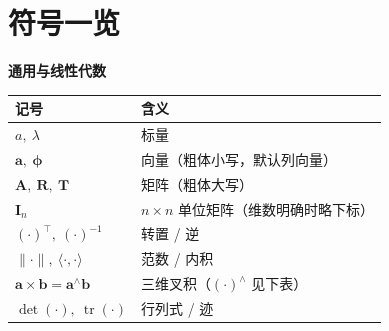 \section*{符号一览}

\begin{center}\small
\textbf{通用与线性代数}\par\vspace{3pt}
\begin{tabular}{ll}
\toprule
记号 & 含义 \\
\midrule
$a,\ \lambda$ & 标量 \\
$\mathbf{a},\ \boldsymbol{\phi}$ & 向量（粗体小写，默认列向量） \\
$\mathbf{A},\ \mathbf{R},\ \mathbf{T}$ & 矩阵（粗体大写） \\
$\mathbf{I}_n$ & $n\times n$ 单位矩阵（维数明确时略下标） \\
$(\cdot)^\top,\ (\cdot)^{-1}$ & 转置 / 逆 \\
$\lVert\cdot\rVert,\ \langle\cdot,\cdot\rangle$ & 范数 / 内积 \\
$\mathbf{a}\times\mathbf{b}=\mathbf{a}^\wedge\mathbf{b}$ & 三维叉积（$(\cdot)^\wedge$ 见下表） \\
$\det(\cdot),\ \operatorname{tr}(\cdot)$ & 行列式 / 迹 \\
\bottomrule
\end{tabular}
\end{center}

